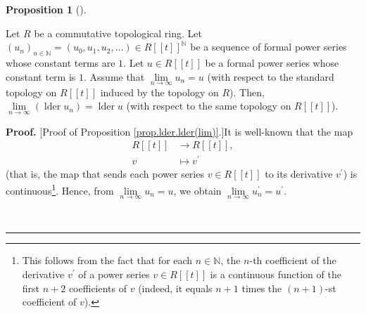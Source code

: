 \documentclass[numbers=enddot,12pt,final,onecolumn,notitlepage]{scrartcl}%
\theoremstyle{definition}
\newtheorem{prop}[theo]{Proposition}
\newenvironment{proposition}[1][]
{\begin{prop}[#1]\begin{leftbar}}
{\end{leftbar}\end{prop}}
\newenvironment{proof}[1][Proof]{\noindent\textbf{#1.} }{\ \rule{0.5em}{0.5em}}
\newenvironment{verlong}{}{}
\begin{document}
\begin{verlong}
\begin{proposition}
\label{prop.lder.lder(lim)}Let $R$ be a commutative topological ring. Let
$\left(  u_{n}\right)  _{n\in\mathbb{N}}=\left(  u_{0},u_{1},u_{2}%
,\ldots\right)  \in R\left[  \left[  t\right]  \right]  ^{\mathbb{N}}$ be a
sequence of formal power series whose constant terms are $1$. Let $u\in
R\left[  \left[  t\right]  \right]  $ be a formal power series whose constant
term is $1$. Assume that $\lim\limits_{n\rightarrow\infty}u_{n}=u$ (with
respect to the standard topology on $R\left[  \left[  t\right]  \right]  $
induced by the topology on $R$). Then, $\lim\limits_{n\rightarrow\infty
}\left(  \operatorname*{lder}u_{n}\right)  =\operatorname*{lder}u$ (with
respect to the same topology on $R\left[  \left[  t\right]  \right]  $).
\end{proposition}

\begin{proof}
[Proof of Proposition \ref{prop.lder.lder(lim)}.]It is well-known that the map%
\begin{align*}
R\left[  \left[  t\right]  \right]   &  \rightarrow R\left[  \left[  t\right]
\right]  ,\\
v  &  \mapsto v^{\prime}%
\end{align*}
(that is, the map that sends each power series $v\in R\left[  \left[
t\right]  \right]  $ to its derivative $v^{\prime}$) is
continuous\footnote{This follows from the fact that for each $n\in\mathbb{N}$,
the $n$-th coefficient of the derivative $v^{\prime}$ of a power series $v\in
R\left[  \left[  t\right]  \right]  $ is a continuous function of the first
$n+2$ coefficients of $v$ (indeed, it equals $n+1$ times the $\left(
n+1\right)  $-st coefficient of $v$).}. Hence, from $\lim\limits_{n\rightarrow
\infty}u_{n}=u$, we obtain $\lim\limits_{n\rightarrow\infty}u_{n}^{\prime
}=u^{\prime}$.


\end{proof}
\end{verlong}
\end{document}
